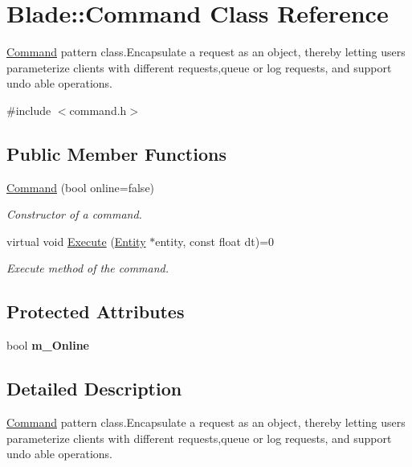 \hypertarget{class_blade_1_1_command}{}\section{Blade\+:\+:Command Class Reference}
\label{class_blade_1_1_command}


\hyperlink{class_blade_1_1_command}{Command} pattern class.\+Encapsulate a request as an object, thereby letting users parameterize clients with different requests,queue or log requests, and support undo able operations.  




{\ttfamily \#include $<$command.\+h$>$}

\subsection*{Public Member Functions}
\begin{DoxyCompactItemize}
\item 
\hyperlink{class_blade_1_1_command_ad2d8d0d0f38cb5e3142ae4876e041946}{Command} (bool online=false)
\begin{DoxyCompactList}\small\item\em Constructor of a command. \end{DoxyCompactList}\item 
virtual void \hyperlink{class_blade_1_1_command_a9110a3b9580a9e820c9318cf96bb6c41}{Execute} (\hyperlink{class_blade_1_1_entity}{Entity} $\ast$entity, const float dt)=0
\begin{DoxyCompactList}\small\item\em Execute method of the command. \end{DoxyCompactList}\end{DoxyCompactItemize}
\subsection*{Protected Attributes}
\begin{DoxyCompactItemize}
\item 
\mbox{\label{class_blade_1_1_command_ab473805a51a806fc54204078604d4550}} 
bool {\bfseries m\+\_\+\+Online}
\end{DoxyCompactItemize}


\subsection{Detailed Description}
\hyperlink{class_blade_1_1_command}{Command} pattern class.\+Encapsulate a request as an object, thereby letting users parameterize clients with different requests,queue or log requests, and support undo able operations. 

